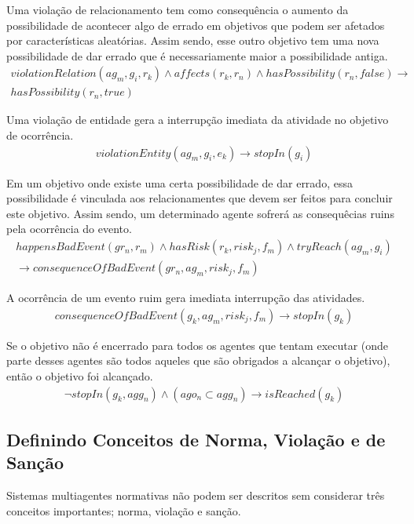 \documentclass[12pt]{article}
\begin{document}
Uma violação de relacionamento tem como consequência o aumento da possibilidade de acontecer algo de errado em objetivos que podem ser afetados por características aleatórias. Assim sendo, esse outro objetivo tem uma nova possibilidade de dar errado que é necessariamente maior a possibilidade antiga.
\begin{eqnarray}\label{rel11}\nonumber
	violationRelation(ag_m,g_i,r_k) \wedge affects(r_k,r_n) \wedge hasPossibility(r_n,false) \to \\  
	hasPossibility(r_n,true)
\end{eqnarray}

Uma violação de entidade gera a interrupção imediata da atividade no objetivo de ocorrência.
\begin{eqnarray}\label{rel12}
	violationEntity(ag_m,g_i,e_k) \to stopIn(g_i)
\end{eqnarray}

Em um objetivo onde existe uma certa possibilidade de dar errado, essa possibilidade é vinculada aos relacionamentes que devem ser feitos para concluir este objetivo. Assim sendo, um determinado agente sofrerá as consequêcias ruins pela ocorrência do evento.
\begin{eqnarray}\label{rel13}\nonumber
	happensBadEvent(gr_n,r_m) \wedge hasRisk(r_k,risk_j,f_m) \wedge tryReach(ag_m,g_i) \nonumber \\ 
	\to consequenceOfBadEvent(gr_n,ag_m,risk_j,f_m)
\end{eqnarray}

A ocorrência de um evento ruim gera imediata interrupção das atividades.
\begin{eqnarray}\label{rel14}
	consequenceOfBadEvent(g_k,ag_m,risk_j,f_m) \to stopIn(g_k)
\end{eqnarray}

Se o objetivo não é encerrado para todos os agentes que tentam executar (onde parte desses agentes são todos aqueles que são obrigados a alcançar o objetivo), então o objetivo foi alcançado.  
\begin{eqnarray}\label{rel15}
	\neg stopIn(g_k,agg_n) \wedge (ago_n \subset agg_n) \to isReached(g_k)
\end{eqnarray}

\subsection{Definindo Conceitos de Norma, Violação e de Sanção}

Sistemas multiagentes normativas não podem ser descritos sem considerar três conceitos importantes; norma, violação e sanção. 
\end{document}
